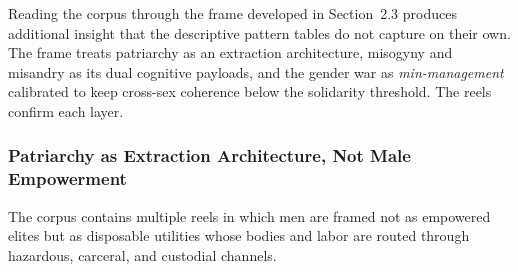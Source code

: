 \documentclass[12pt]{article}
\begin{document}
Reading the corpus through the frame developed in Section~2.3 produces additional insight that the descriptive pattern tables do not capture on their own. The frame treats patriarchy as an extraction architecture, misogyny and misandry as its dual cognitive payloads, and the gender war as \textit{min-management} calibrated to keep cross-sex coherence below the solidarity threshold. The reels confirm each layer.

\subsubsection{Patriarchy as Extraction Architecture, Not Male Empowerment}

The corpus contains multiple reels in which men are framed not as empowered elites but as disposable utilities whose bodies and labor are routed through hazardous, carceral, and custodial channels.
\end{document}
